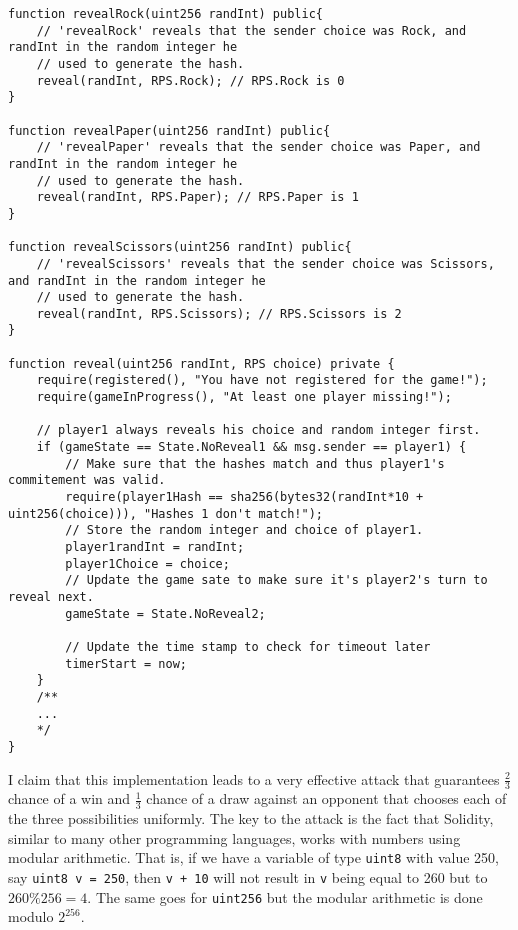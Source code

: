 \documentclass{article}
\begin{document}
    \begin{lstlisting}[language=Solidity]
function revealRock(uint256 randInt) public{
    // 'revealRock' reveals that the sender choice was Rock, and randInt in the random integer he
    // used to generate the hash.
    reveal(randInt, RPS.Rock); // RPS.Rock is 0
}

function revealPaper(uint256 randInt) public{
    // 'revealPaper' reveals that the sender choice was Paper, and randInt in the random integer he
    // used to generate the hash.
    reveal(randInt, RPS.Paper); // RPS.Paper is 1
}

function revealScissors(uint256 randInt) public{
    // 'revealScissors' reveals that the sender choice was Scissors, and randInt in the random integer he
    // used to generate the hash.
    reveal(randInt, RPS.Scissors); // RPS.Scissors is 2
}

function reveal(uint256 randInt, RPS choice) private {
    require(registered(), "You have not registered for the game!");
    require(gameInProgress(), "At least one player missing!");

    // player1 always reveals his choice and random integer first.
    if (gameState == State.NoReveal1 && msg.sender == player1) {
        // Make sure that the hashes match and thus player1's commitement was valid.
        require(player1Hash == sha256(bytes32(randInt*10 + uint256(choice))), "Hashes 1 don't match!");
        // Store the random integer and choice of player1.
        player1randInt = randInt;
        player1Choice = choice;
        // Update the game sate to make sure it's player2's turn to reveal next.
        gameState = State.NoReveal2;

        // Update the time stamp to check for timeout later
        timerStart = now;
    }
    /**
    ...
    */
}
    \end{lstlisting}

    \noindent I claim that this implementation leads to a
    very effective attack that guarantees \(\frac{2}{3}\)
    chance of a win and \(\frac{1}{3}\) chance of a draw
    against an opponent that chooses each of the three
    possibilities uniformly. The key to the attack is the
    fact that Solidity, similar to many other programming
    languages, works with numbers using modular arithmetic.
    That is, if we have a variable of type \verb|uint8| with
    value 250, say \verb|uint8 v = 250|, then \verb|v + 10|
    will not result in \verb|v| being equal to 260 but to
    \(260 \% 256 = 4\). The same goes for \verb|uint256| but
    the modular arithmetic is done modulo \(2^{256}\).
    \newline
\end{document}
